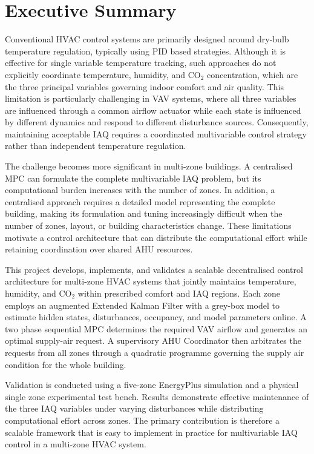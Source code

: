 \documentclass[12pt, a4paper]{article}
\begin{document}
	\section*{Executive Summary}
	Conventional HVAC control systems are primarily designed around dry-bulb temperature regulation, typically using PID based strategies. Although it is effective for single variable temperature tracking, such approaches do not explicitly coordinate temperature, humidity, and CO$_2$ concentration, which are the three principal variables governing indoor comfort and air quality. This limitation is particularly challenging in VAV systems, where all three variables are influenced through a common airflow actuator while each state is influenced by different dynamics and respond to different disturbance sources. Consequently, maintaining acceptable IAQ requires a coordinated multivariable control strategy rather than independent temperature regulation.
	
	The challenge becomes more significant in multi-zone buildings. A centralised MPC can formulate the complete multivariable IAQ problem, but its computational burden increases with the number of zones. In addition, a centralised approach requires a detailed model representing the complete building, making its formulation and tuning increasingly difficult when the number of zones, layout, or building characteristics change. These limitations motivate a control architecture that can distribute the computational effort while retaining coordination over shared AHU resources.
	
	This project develops, implements, and validates a scalable decentralised control architecture for multi-zone HVAC systems that jointly maintains temperature, humidity, and CO$_2$ within prescribed comfort and IAQ regions. Each zone employs an augmented Extended Kalman Filter with a grey-box model to estimate hidden states, disturbances, occupancy, and model parameters online. A two phase sequential MPC determines the required VAV airflow and generates an optimal supply-air request. A supervisory AHU Coordinator then arbitrates the requests from all zones through a quadratic programme governing the supply air condition for the whole building.
	
	Validation is conducted using a five-zone EnergyPlus simulation and a physical single zone experimental test bench. Results demonstrate effective maintenance of the three IAQ variables under varying disturbances while distributing computational effort across zones. The primary contribution is therefore a scalable framework that is easy to implement in practice for multivariable IAQ control in a multi-zone HVAC system.
	\newpage
	
\end{document}
